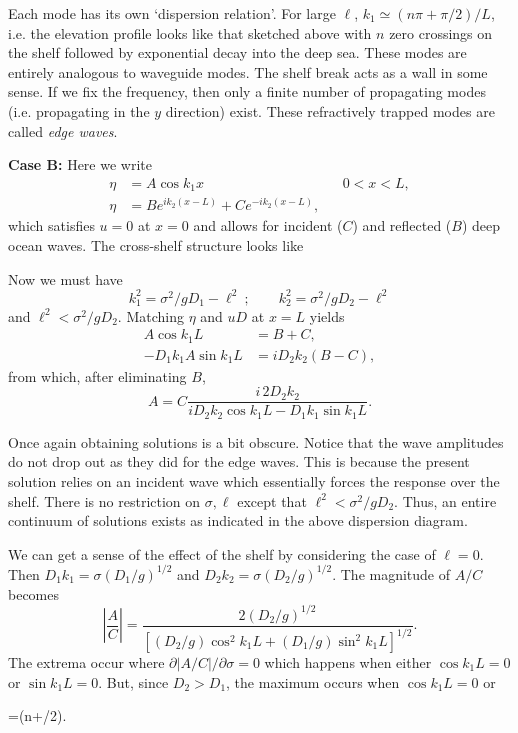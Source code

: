 Each mode has its own `dispersion relation'. For large $\ell$,
$k_1\simeq(n\pi+\pi/2)/L$, i.e. the elevation profile looks like that sketched above
with $n$ zero crossings on the shelf followed by exponential decay into the deep sea.
These modes are entirely analogous to waveguide modes. The shelf break acts as a wall
in some sense. If we fix the frequency, then only a finite number of propagating modes
(i.e. propagating in the $y$ direction) exist. These refractively trapped modes are
called \emph{edge waves}.

\textbf{Case B:} Here we write
\begin{align*}
	\eta & =A\cos k_1x                      &  & 0<x<L, \\
	\eta & =Be^{ik_2(x-L)}+Ce^{-ik_2(x-L)},
\end{align*}
which satisfies $u=0$ at $x=0$ and allows for incident ($C$) and reflected ($B$) deep
ocean waves. The cross-shelf structure looks like

\sourcepagebreak


\wavefiguremark

Now we must have
\[
	k_1^2=\sigma^2/gD_1-\ell^2
	\ ;\qquad
	k_2^2=\sigma^2/gD_2-\ell^2
\]
and $\ell^2<\sigma^2/gD_2$. Matching $\eta$ and $uD$ at $x=L$ yields
\begin{align*}
	A\cos k_1L        & =B+C,          \\
	-D_1k_1A\sin k_1L & =iD_2k_2(B-C),
\end{align*}
from which, after eliminating $B$,
\[
	A=C\frac{i\,2D_2k_2}
	{iD_2k_2\cos k_1L-D_1k_1\sin k_1L}.
\]

Once again obtaining solutions is a bit obscure. Notice that the wave amplitudes do
not drop out as they did for the edge waves. This is because the present solution
relies on an incident wave which essentially forces the response over the shelf. There
is no restriction on $\sigma,\ell$ except that $\ell^2<\sigma^2/gD_2$. Thus, an entire
continuum of solutions exists as indicated in the above dispersion diagram.

We can get a sense of the effect of the shelf by considering the case of $\ell=0$.
Then $D_1k_1=\sigma(D_1/g)^{1/2}$ and
$D_2k_2=\sigma(D_2/g)^{1/2}$. The magnitude of $A/C$ becomes
\[
	\left|\frac{A}{C}\right|
	=\frac{2(D_2/g)^{1/2}}
	{\left[(D_2/g)\cos^2k_1L+(D_1/g)\sin^2k_1L\right]^{1/2}}.
\]
The extrema occur where $\partial|A/C|/\partial\sigma=0$ which happens when either
$\cos k_1L=0$ or $\sin k_1L=0$. But, since $D_2>D_1$, the maximum occurs when
$\cos k_1L=0$ or
\begin{waveequation}
	\sigma=(n\pi+\pi/2).
\end{waveequation}

